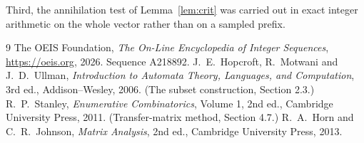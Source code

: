 \documentclass[11pt,a4paper]{article}
\theoremstyle{plain}
\theoremstyle{definition}
\begin{document}
Third, the annihilation test of Lemma~\ref{lem:crit} was carried out in exact integer
arithmetic on the whole vector rather than on a sampled prefix.

\begin{thebibliography}{9}
 The OEIS Foundation, \emph{The On-Line Encyclopedia of Integer
Sequences}, \url{https://oeis.org}, 2026. Sequence A218892.
 J.~E.~Hopcroft, R.~Motwani and J.~D.~Ullman, \emph{Introduction to Automata
Theory, Languages, and Computation}, 3rd ed., Addison--Wesley, 2006. (The subset
construction, Section 2.3.)
 R.~P.~Stanley, \emph{Enumerative Combinatorics}, Volume 1, 2nd ed.,
Cambridge University Press, 2011. (Transfer-matrix method, Section 4.7.)
 R.~A.~Horn and C.~R.~Johnson, \emph{Matrix Analysis}, 2nd ed., Cambridge
University Press, 2013.
\end{thebibliography}
\end{document}
